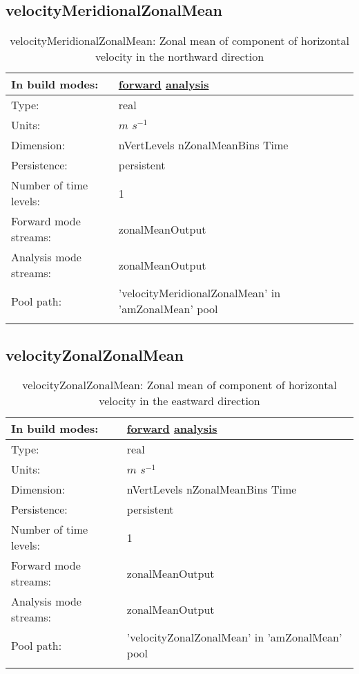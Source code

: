 \subsection[velocityMeridionalZonalMean]{velocityMeridionalZonalMean}
\label{subsec:var_sec_amZonalMean_velocityMeridionalZonalMean}
\begin{center}
\begin{longtable}{| p{2.0in} | p{4.0in} |}
        \hline 
        In build modes: & \hyperref[subsec:forward_var_tab_amZonalMean]{forward} \hyperref[subsec:analysis_var_tab_amZonalMean]{analysis} \\
        \hline 
        Type: & real \\
        \hline 
        Units: & $m$ $s^{-1}$ \\
        \hline 
        Dimension: & nVertLevels nZonalMeanBins Time \\
        \hline 
        Persistence: & persistent \\
        \hline 
        Number of time levels: & 1 \\
        \hline 
		 Forward mode streams: &  zonalMeanOutput \\
        \hline 
		 Analysis mode streams: &  zonalMeanOutput \\
        \hline 
            Pool path: & 'velocityMeridionalZonalMean' in 'amZonalMean' pool
 \\
		 \hline 
    \caption{velocityMeridionalZonalMean: Zonal mean of component of horizontal velocity in the northward direction}
\end{longtable}
\end{center}
\subsection[velocityZonalZonalMean]{velocityZonalZonalMean}
\label{subsec:var_sec_amZonalMean_velocityZonalZonalMean}
\begin{center}
\begin{longtable}{| p{2.0in} | p{4.0in} |}
        \hline 
        In build modes: & \hyperref[subsec:forward_var_tab_amZonalMean]{forward} \hyperref[subsec:analysis_var_tab_amZonalMean]{analysis} \\
        \hline 
        Type: & real \\
        \hline 
        Units: & $m$ $s^{-1}$ \\
        \hline 
        Dimension: & nVertLevels nZonalMeanBins Time \\
        \hline 
        Persistence: & persistent \\
        \hline 
        Number of time levels: & 1 \\
        \hline 
		 Forward mode streams: &  zonalMeanOutput \\
        \hline 
		 Analysis mode streams: &  zonalMeanOutput \\
        \hline 
            Pool path: & 'velocityZonalZonalMean' in 'amZonalMean' pool
 \\
		 \hline 
    \caption{velocityZonalZonalMean: Zonal mean of component of horizontal velocity in the eastward direction}
\end{longtable}
\end{center}
